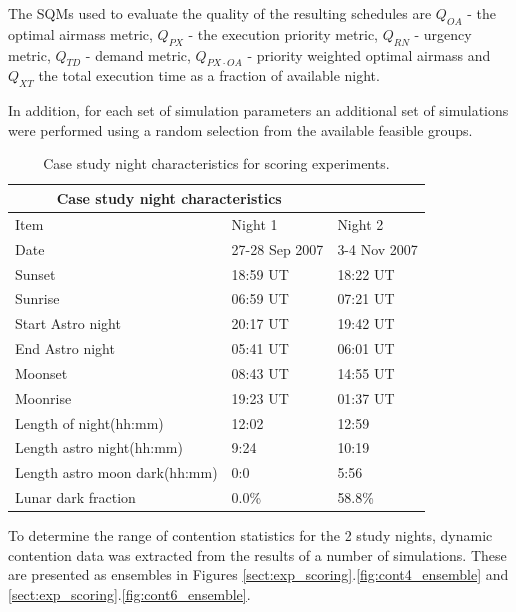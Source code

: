 The SQMs used to evaluate the quality of the resulting schedules are $Q_{OA}$ - the optimal airmass metric, $Q_{PX}$ - the execution priority metric, $Q_{RN}$ - urgency metric, $Q_{TD}$ - demand metric, $Q_{PX \cdot OA}$ - priority weighted optimal airmass and $Q_{XT}$ the total execution time as a fraction of available night. 

In addition, for each set of simulation parameters an additional set of simulations were performed using a random selection from the available feasible groups.

\begin{table}[htbp]
\begin{center}

\begin{tabular}{lll}
\toprule
\multicolumn{2}{c}{Case study night characteristics} \\
\midrule
Item & Night 1 & Night 2 \\
\midrule
Date                & 27-28 Sep 2007 & 3-4 Nov 2007\\
Sunset              & 18:59 UT         & 18:22 UT\\
Sunrise             & 06:59 UT         & 07:21 UT\\
Start Astro night   & 20:17 UT         & 19:42 UT\\
End Astro night     & 05:41 UT         & 06:01 UT\\
Moonset             & 08:43 UT          & 14:55 UT\\
Moonrise            & 19:23 UT          & 01:37 UT\\
\midrule
Length of night(hh:mm)        & 12:02   & 12:59\\
Length astro night(hh:mm)     & 9:24    & 10:19\\
Length astro moon dark(hh:mm) & 0:0     & 5:56\\
Lunar dark fraction & 0.0\%   & 58.8\%\\
\bottomrule
\end{tabular}
\caption[Case study night characteristics for scoring experiments]
{Case study night characteristics for scoring experiments.}
\label{tab:scoring_nights}
\end{center}
\end{table}


To determine the range of contention statistics for the 2 study nights, dynamic contention data was extracted from the results of a number of simulations. These are presented as ensembles in Figures \ref{sect:exp_scoring}.\ref{fig:cont4_ensemble} and \ref{sect:exp_scoring}.\ref{fig:cont6_ensemble}.

